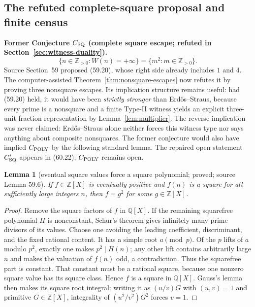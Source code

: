 \documentclass[10pt,reqno]{amsart}
\newtheorem{lemma}[theorem]{Lemma}
\theoremstyle{definition}
\newcommand{\1}{\mathbf 1}
\begin{document}
\subsection{The refuted complete-square proposal and finite census}
\medskip\noindent\textbf{Former Conjecture $C_{\rm SQ}$ (complete square
escape; refuted in Section~\ref{sec:witness-duality}).}
\begin{equation}\tag{59.20}
       \{n\in\mathbb Z_{>0}:W(n)=+\infty\}
             =\{m^2:m\in\mathbb Z_{>0}\}.
\end{equation}
Source Section~59 proposed (59.20), whose right side already includes $1$
and $4$.  The computer-assisted Theorem~\ref{thm:nonsquare-escapes} now
refutes it by proving three nonsquare escapes.  Its implication structure
remains useful: had (59.20) held, it would have been \emph{strictly
stronger} than Erd\H{o}s--Straus, because every prime is a nonsquare and a
finite Type-II witness yields an explicit three-unit-fraction representation
by Lemma~\ref{lem:multiplier}.  The reverse implication was never claimed:
Erd\H{o}s--Straus alone neither forces this witness type nor says anything
about composite nonsquares.  The former conjecture would also have implied
$C_{\rm POLY}$ by the following standard lemma.  The repaired open statement
$C_{\rm SQ}'$ appears in (60.22); $C_{\rm POLY}$ remains open.

\begin{lemma}[eventual square values force a square polynomial; proved;
source Lemma 59.6]
\label{lem:eventual-square-polynomial}
If $f\in\mathbb Z[X]$ is eventually positive and $f(n)$ is a square for all
sufficiently large integers $n$, then $f=g^2$ for some $g\in\mathbb Z[X]$.
\end{lemma}
\begin{proof}
Remove the square factors of $f$ in $\mathbb Q[X]$.  If the remaining
squarefree polynomial $H$ is nonconstant, Schur's theorem gives infinitely
many prime divisors of its values.  Choose one avoiding the leading
coefficient, discriminant, and the fixed rational content.  It has a simple
root $a\pmod p$.  Of the $p$ lifts of $a$ modulo $p^2$, exactly one makes
$p^2\mid H(n)$; any other lift contains arbitrarily large $n$ and makes the
valuation of $f(n)$ odd, a contradiction.  Thus the squarefree part is
constant.  That constant must be a rational square, because one nonzero
square value has its square class.  Hence $f$ is a square in
$\mathbb Q[X]$.  Gauss's lemma then makes its square root integral: writing
it as $(u/v)G$ with $(u,v)=1$ and primitive $G\in\mathbb Z[X]$, integrality
of $(u^2/v^2)G^2$ forces $v=1$.
\end{proof}
\end{document}
